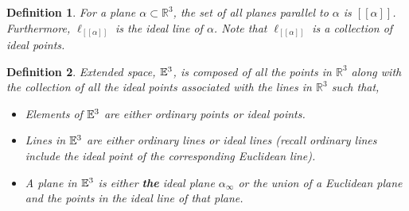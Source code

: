 \documentclass[12pt]{amsart}
\newtheorem*{definition}{Definition}
\theoremstyle{remark}
\newtheorem*{basic notion}{Basic Notion}
\newcommand{\RR}{\ensuremath{\mathbb R}}
\newcommand{\EE}{{\ensuremath\mathbb E}}
\begin{document}
\begin{definition} 
For a plane $\alpha \subset \RR^3$, the set of all planes parallel to $\alpha$ is $[\! [\alpha]\!]$. Furthermore,  $\ell_{[\![\alpha]\!]}$ is the ideal line of $\alpha$. Note that $\ell_{[\![\alpha]\!]}$ is a collection of ideal points.
\end{definition}
\smallskip

\begin{definition}
Extended space, $\EE^3$, is composed of all the points in $\RR^3$ along with the collection of all the ideal points associated with the lines in $\RR^3$ such that,
\begin{itemize}
\item Elements of $\EE^3$ are either ordinary points or ideal points.
\item Lines in $\EE^3$ are either ordinary lines or ideal lines (recall ordinary lines include the ideal point of the corresponding Euclidean line). 
\item A plane in $\EE^3$ is either \textbf{the} ideal plane $\alpha_{\infty}$ or the union of a Euclidean plane and the points in the ideal line of that plane.
\end{itemize}
\end{definition}
\end{document}
